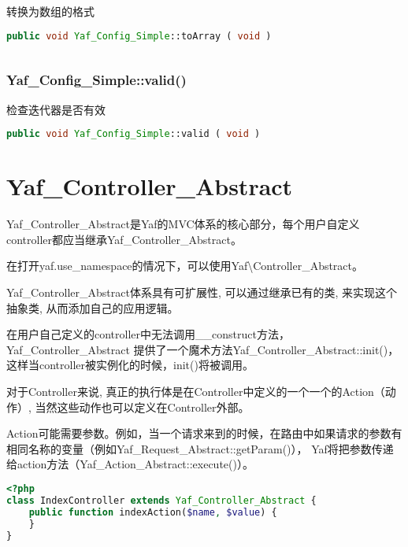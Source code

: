 转换为数组的格式

\begin{lstlisting}[language=PHP]
public void Yaf_Config_Simple::toArray ( void )
\end{lstlisting}

\begin{lstlisting}[language=PHP]

\end{lstlisting}



\subsection{Yaf\_Config\_Simple::valid()}

检查迭代器是否有效

\begin{lstlisting}[language=PHP]
public void Yaf_Config_Simple::valid ( void )
\end{lstlisting}




\chapter{Yaf\_Controller\_Abstract}


Yaf\_Controller\_Abstract是Yaf的MVC体系的核心部分，每个用户自定义controller都应当继承Yaf\_Controller\_Abstract。


在打开yaf.use\_namespace的情况下，可以使用Yaf\textbackslash Controller\_Abstract。

Yaf\_Controller\_Abstract体系具有可扩展性, 可以通过继承已有的类, 来实现这个抽象类, 从而添加自己的应用逻辑。

在用户自己定义的controller中无法调用\_\_construct方法，Yaf\_Controller\_Abstract 提供了一个魔术方法Yaf\_Controller\_Abstract::init()，这样当controller被实例化的时候，init()将被调用。

对于Controller来说, 真正的执行体是在Controller中定义的一个一个的Action（动作）, 当然这些动作也可以定义在Controller外部。

Action可能需要参数。例如，当一个请求来到的时候，在路由中如果请求的参数有相同名称的变量（例如Yaf\_Request\_Abstract::getParam()）， Yaf将把参数传递给action方法（Yaf\_Action\_Abstract::execute()）。


\begin{lstlisting}[language=PHP]
<?php
class IndexController extends Yaf_Controller_Abstract {
    public function indexAction($name, $value) {
    }
}
\end{lstlisting}



